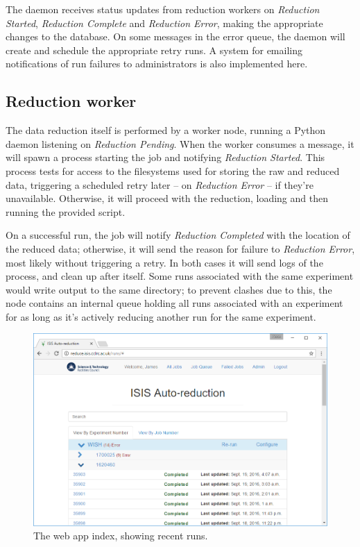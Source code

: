 \documentclass[twocolumn]{article}
\begin{document}
The daemon receives status updates from reduction workers on
\emph{Reduction Started}, \emph{Reduction Complete} and \emph{Reduction
Error}, making the appropriate changes to the database. On some messages
in the error queue, the daemon will create and schedule the appropriate
retry runs. A system for emailing notifications of run failures to
administrators is also implemented here.

\subsection{Reduction worker}\label{reduction-worker}

The data reduction itself is performed by a worker node, running a
Python daemon listening on \emph{Reduction Pending}. When the worker
consumes a message, it will spawn a process starting the job and
notifying \emph{Reduction Started}. This process tests for access to the
filesystems used for storing the raw and reduced data, triggering a
scheduled retry later -- on \emph{Reduction Error} -- if they're
unavailable. Otherwise, it will proceed with the reduction, loading and
then running the provided script.

On a successful run, the job will notify \emph{Reduction Completed} with
the location of the reduced data; otherwise, it will send the reason for
failure to \emph{Reduction Error}, most likely without triggering a
retry. In both cases it will send logs of the process, and clean up
after itself. Some runs associated with the same experiment would write
output to the same directory; to prevent clashes due to this, the node
contains an internal queue holding all runs associated with an
experiment for as long as it's actively reducing another run for the
same experiment.


\begin{figure}
\centering\includegraphics[width=0.8\linewidth]{index.png}
\caption{The web app index, showing recent runs.}
\end{figure}
\end{document}
